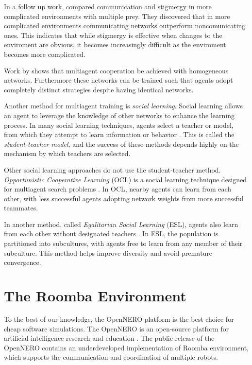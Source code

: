 \documentclass[conference]{IEEEtran}
\begin{document}
In a follow up work, \cite{rajagopalan2011role} compared communication and stigmergy in more complicated environments with multiple prey. They discovered that in more complicated environments communicating networks outperform noncomunicating ones. This indicates that while stigmergy is effective when changes to the enviroment are obvious, it becomes increasingly difficult as the enviroment becomes more complicated.

Work by \cite{bryant2003neuroevolution} shows that multiagent cooperation be achieved with homogeneous networks. Furthermore these networks can be trained such that agents adopt completely distinct strategies despite having identical networks.

Another method for multiagent training is \textit{social learning}. Social learning allows an agent to leverage the knowledge of other networks to enhance the learning process.
In many social learning techniques, agents select a teacher or model, from which they attempt to learn information or behavior \cite{acerbi2006cultural}. This is called the \textit{student-teacher model}, and the success of these methods depends highly on the mechanism by which teachers are selected.

Other social learning approaches do not use the student-teacher method. \textit{Opportunistic Cooperative Learning} (OCL) is a social learning technique designed for multiagent search problems \cite{yang2002ocl}. In OCL, nearby agents can learn from each other, with less successful agents adopting network weights from more successful teammates. 

In another method, called \textit{Egalitarian Social Learning} (ESL), agents also learn from each other without designated teachers \cite{miikkulainen2012multiagent}. In ESL, the population is partitioned into subcultures, with agents free to learn from any member of their subculture. This method helps improve diversity and avoid premature convergence.


\section{The Roomba Environment} \label{section:environment}
To the best of our knowledge, the OpenNERO platform is the best choice for
cheap software simulations. 
The OpenNERO is an open-source platform for artificial intelligence
research and education \cite{karpov2008opennero}. 
The public release of the OpenNERO contains an underdeveloped implementation
of Roomba environment, which supports the communication and coordination of
multiple robots.
\end{document}
